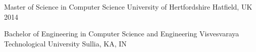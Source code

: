 
\begin{cventries}
    \cventry
    {Master of Science in Computer Science} %
    {University of Hertfordshire} %
    {Hatfield, UK} %
    {2014} %
    {
    }

    \cventry
    {Bachelor of Engineering in Computer Science and Engineering} %
    {Visvesvaraya Technological University} %
    {Sullia, KA, IN} %
    {} %
    {
    }
\end{cventries}
